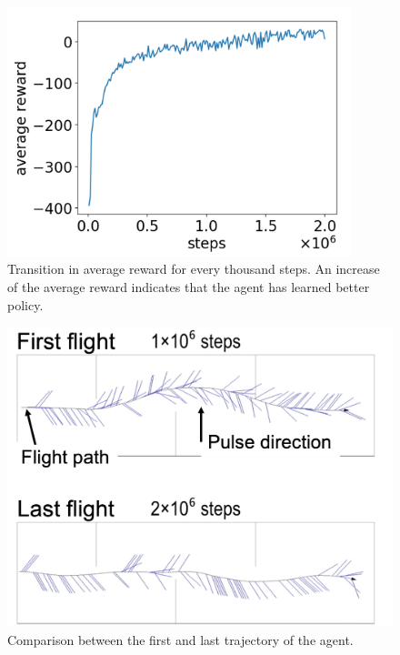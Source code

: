 \documentclass[../main]{subfiles}
\begin{document}
\newpage
{}
\begin{figure}[H]
  \centering
  \vfill
  \includegraphics[width=10cm]{figures/training_development.png}
  \caption{
    Transition in average reward for every thousand steps.
    An increase of the average reward indicates that 
    the agent has learned better policy.
  }\label{fig:avearge_reward}
\end{figure}


\newpage
{}
\begin{figure}[H]
  \centering
  \vfill
  \includegraphics[width=12cm]{figures/agent_trajectory.png}
  \caption{
    Comparison between the first and last trajectory of the agent.
  }\label{fig:agent_trajectory}
\end{figure}
\end{document}

